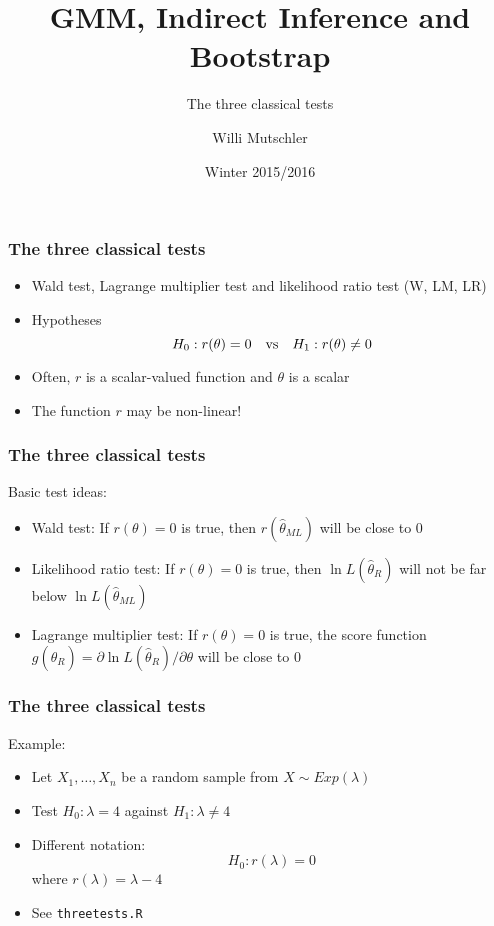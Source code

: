\documentclass[notes=show]{beamer}
\begin{document}
\title{GMM, Indirect Inference and Bootstrap}
\subtitle{The three classical tests}
\author[Willi Mutschler]{Willi Mutschler}
\date{Winter 2015/2016}
\maketitle

\begin{frame}\frametitle{The three classical tests}
\begin{itemize}
    \item Wald test, Lagrange multiplier test and likelihood ratio test \newline
    (W, LM, LR)
    \item Hypotheses
    \begin{equation*}
    H_{0}:r(\theta )=0\mathbf{\quad }\text{vs\quad }H_{1}:r(\theta )\neq 0
    \end{equation*}
    \item Often, $r$ is a scalar-valued function and $\theta $ is a scalar
    \item The function $r$ may be non-linear!
\end{itemize}
\end{frame}


\begin{frame}\frametitle{The three classical tests}
Basic test ideas:
\begin{itemize}
    \item Wald test:
    If $r(\theta )=0$ is true, then $r(\hat{\theta}_{ML})$ will be close to 0
    \item Likelihood ratio test:
    If $r(\theta )=0$ is true, then $\ln L(\hat{\theta}_{R})$ will not be far below $\ln L(\hat{\theta}_{ML})$

    \item Lagrange multiplier test:
    If $r(\theta )=0$ is true, the score function $g(\hat{\theta}_{R})=\partial \ln L(\hat{\theta}_{R})/\partial \theta $ will be close to 0
\end{itemize}
\end{frame}


\begin{frame}\frametitle{The three classical tests}
Example:
\begin{itemize}
    \item Let $X_{1},\ldots ,X_{n}$ be a random sample from $X\sim Exp(\lambda )$
    \item Test $H_{0}:\lambda =4$ against $H_{1}:\lambda \neq 4$
    \item Different notation:
    \begin{equation*}
        H_{0}:r(\lambda )=0
    \end{equation*}%
    where $r(\lambda )=\lambda -4$
    \item See \texttt{threetests.R}
\end{itemize}
\end{frame}
\end{document}
